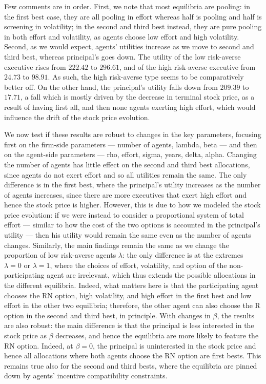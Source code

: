 Few comments are in order. First, we note that most equilibria are pooling: in the first best case, they are all pooling in effort whereas half is pooling and half is screening in volatility; in the second and third best instead, they are pure pooling in both effort and volatility, as agents choose low effort and high volatility. Second, as we would expect, agents' utilities increase as we move to second and third best, whereas principal's goes down. The utility of the low risk-averse executive rises from $222.42$ to $296.61$, and of the high risk-averse executive from $24.73$ to $98.91$. As such, the high risk-averse type seems to be comparatively better off. On the other hand, the principal's utility falls down from $209.39$ to $17.71$, a fall which is mostly driven by the decrease in terminal stock price, as a result of having first all, and then none agents exerting high effort, which would influence the drift of the stock price evolution.

We now test if these results are robust to changes in the key parameters, focusing first on the firm-side parameters --- number of agents, lambda, beta --- and then on the agent-side parameters --- rho, effort, sigma, years, delta, alpha.
Changing the number of agents has little effect on the second and third best allocations, since agents do not exert effort and so all utilities remain the same. The only difference is in the first best, where the principal's utility increases as the number of agents increases, since there are more executives that exert high effort and hence the stock price is higher. However, this is due to how we modeled the stock price evolution: if we were instead to consider a proportional system of total effort --- similar to how the cost of the two options is accounted in the principal's utility --- then his utility would remain the same even as the number of agents changes. Similarly, the main findings remain the same as we change the proportion of low risk-averse agents $\lambda$: the only difference is at the extremes $\lambda = 0$ or $\lambda = 1$, where the choices of effort, volatility, and option of the non-participating agent are irrelevant, which thus extends the possible allocations in the different equilibria. Indeed, what matters here is that the participating agent chooses the RN option, high volatility, and high effort in the first best and low effort in the other two equilibria; therefore, the other agent can also choose the R option in the second and third best, in principle. With changes in $\beta$, the results are also robust: the main difference is that the principal is less interested in the stock price as $\beta$ decreases, and hence the equilibria are more likely to feature the RN option. Indeed, at $\beta = 0$, the principal is uninterested in the stock price and hence all allocations where both agents choose the RN option are first bests. This remains true also for the second and third bests, where the equilibria are pinned down by agents' incentive compatibility constraints.


